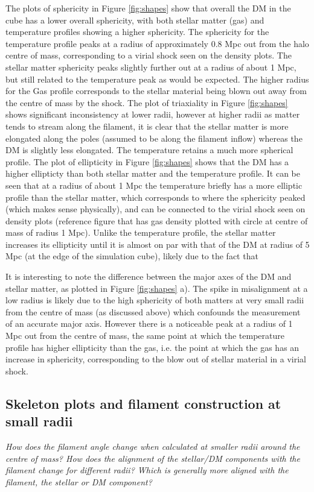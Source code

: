 \documentclass[journal]{IEEEtran}
\begin{document}
The plots of sphericity in Figure \ref{fig:shapes} show that overall the DM in the cube has a lower overall sphericity, with both stellar matter (gas) and temperature profiles showing a higher sphericity. The sphericity for the temperature profile peaks at a radius of approximately 0.8 Mpc out from the halo centre of mass, corresponding to a virial shock seen on the density plots. The stellar matter sphericity peaks slightly further out at a radius of about 1 Mpc, but still related to the temperature peak as would be expected. The higher radius for the Gas profile corresponds to the stellar material being blown out away from the centre of mass by the shock. 
The plot of triaxiality in Figure \ref{fig:shapes} shows significant inconsistency at lower radii, however at higher radii as matter tends to stream along the filament, it is clear that the stellar matter is more elongated along the poles (assumed to be along the filament inflow) whereas the DM is slightly less elongated. The temperature retains a much more spherical profile.
The plot of ellipticity in Figure \ref{fig:shapes} shows that the DM has a higher ellipticty than both stellar matter and the temperature profile. It can be seen that at a radius of about 1 Mpc the temperature briefly has a more elliptic profile than the stellar matter, which corresponds to where the sphericity peaked (which makes sense physically), and can be connected to the virial shock seen on density plots (reference figure that has gas density plotted with circle at centre of mass of radius 1 Mpc). Unlike the temperature profile, the stellar matter increases its ellipticity until it is almost on par with that of the DM at radius of 5 Mpc (at the edge of the simulation cube), likely due to the fact that 

It is interesting to note the difference between the major axes of the DM and stellar matter, as plotted in Figure \ref{fig:shapes} a). The spike in misalignment at a low radius is likely due to the high sphericity of both matters at very small radii from the centre of mass (as discussed above) which confounds the measurement of an accurate major axis. However there is a noticeable peak at a radius of 1 Mpc out from the centre of mass, the same point at which the temperature profile has higher ellipticity than the gas, i.e. the point at which the gas has an increase in sphericity, corresponding to the blow out of stellar material in a virial shock.

\subsection{Skeleton plots and filament construction at small radii}
\textit{How does the filament angle change when calculated at smaller radii around the centre of mass?
How does the alignment of the stellar/DM components with the filament change for different radii?
Which is generally more aligned with the filament, the stellar or DM component?}
\end{document}
